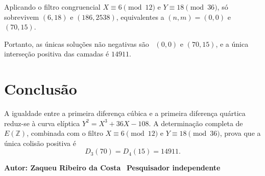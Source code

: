 \documentclass[11pt,letterpaper]{article}
\theoremstyle{definition}
\newcommand{\Dd}[2]{D_{#1}\!\left(#2\right)}
\begin{document}
Aplicando o filtro congruencial \(X\equiv6\pmod{12}\) e \(Y\equiv18\pmod{36}\), só sobrevivem
\((6,18)\) e \((186,2538)\), equivalentes a \((n,m)=(0,0)\) e \((70,15)\).

Portanto, as únicas soluções não negativas são \
\((0,0)\) e \((70,15)\), e a única interseção positiva das camadas é \(14911\).

\section{Conclusão}

A igualdade entre a primeira diferença cúbica e a primeira diferença quártica reduz-se à curva elíptica
\(Y^2=X^3+36X-108\).
A determinação completa de \(E(\mathbb{Z})\), combinada com o filtro
\(X\equiv6\pmod{12}\) e \(Y\equiv18\pmod{36}\),
prova que a única colisão positiva é
\[
  \Dd{3}{70}=\Dd{4}{15}=14911.
\]

\textbf{Autor: Zaqueu Ribeiro da Costa} \
\textbf{Pesquisador independente}
\end{document}
